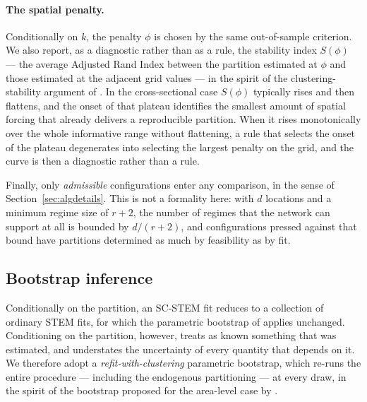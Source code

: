 \paragraph{The spatial penalty.} Conditionally on $k$, the penalty $\phi$ is chosen by the same out-of-sample criterion. We also report, as a diagnostic rather than as a rule, the stability index $S(\phi)$ --- the average Adjusted Rand Index between the partition estimated at $\phi$ and those estimated at the adjacent grid values --- in the spirit of the clustering-stability argument of \citet{vonLuxburg2010}. In the cross-sectional case $S(\phi)$ typically rises and then flattens, and the onset of that plateau identifies the smallest amount of spatial forcing that already delivers a reproducible partition. When it rises monotonically over the whole informative range without flattening, a rule that selects the onset of the plateau degenerates into selecting the largest penalty on the grid, and the curve is then a diagnostic rather than a rule.

Finally, only \emph{admissible} configurations enter any comparison, in the sense of Section~\ref{sec:algdetails}. This is not a formality here: with $d$ locations and a minimum regime size of $r+2$, the number of regimes that the network can support at all is bounded by $d/(r+2)$, and configurations pressed against that bound have partitions determined as much by feasibility as by fit.

\subsection{Bootstrap inference}\label{sec:bootinf}

Conditionally on the partition, an SC-STEM fit reduces to a collection of ordinary STEM fits, for which the parametric bootstrap of \citet{FassoCameletti2010} applies unchanged. Conditioning on the partition, however, treats as known something that was estimated, and understates the uncertainty of every quantity that depends on it. We therefore adopt a \emph{refit-with-clustering} parametric bootstrap, which re-runs the entire procedure --- including the endogenous partitioning --- at every draw, in the spirit of the bootstrap proposed for the area-level case by \citet{MaranzanoMatteraSugasawa2026}.

